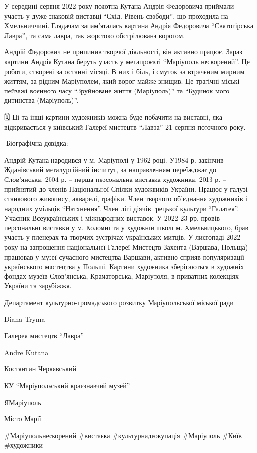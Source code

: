 У середині серпня 2022 року полотна Кутана Андрія Федоровича приймали участь у
дуже знаковій виставці \enquote{Схід. Рівень свободи}, що проходила на Хмельниччині.
Глядачам запам'яталась картина Андрія Федоровича \enquote{Святогірська Лавра}, та сама
лавра, так жорстоко обстрілювана ворогом.

Андрій Федорович не припинив творчої діяльності, він активно працює. Зараз
картини Андрія Кутана беруть участь у мегапроєкті \enquote{Маріуполь нескорений}. Це
роботи, створені за останні місяці. В них і біль, і смуток за втраченим мирним
життям, за рідним Маріуполем, який ворог майже знищив. Це трагічні міські
пейзажі воєнного часу \enquote{Зруйноване життя (Маріуполь)} та
\enquote{Будинок мого дитинства (Маріуполь)}.

🗓 Ці та інші картини художників можна буде побачити на виставці, яка
відкривається у київський Галереї мистецтв \enquote{Лавра} 21 серпня поточного року.

📝Біографічна довідка:

Андрій Кутана народився у м. Маріуполі у 1962 році. У1984 р. закінчив
Жданівський металургійний інститут, за направленням переїжджає до Слов'янська.
2004 р. – перша персональна виставка художника. 2013 р. – прийнятий до членів
Національної Спілки художників України. Працює у галузі станкового живопису,
акварелі, графіки. Член творчого об'єднання художників і народних умільців
\enquote{Натхнення}. Член лігі діячів грецької культури \enquote{Галатея}. Учасник
Всеукраїнських і міжнародних виставок. У 2022-23 рр. провів персональні
виставки у м. Коломиї та у художній школі м. Хмельницького, брав участь у
пленерах та творчих зустрічах українських митців. У листопаді 2022 року на
запрошення національної Галереї Мистецтв Захента (Варшава, Польща) працював у
музеї сучасного мистецтва Варшави, активно сприяв популяризації українського
мистецтва у Польщі. Картини художника зберігаються в художніх фондах музеїв
Слов'янська, Краматорська, Маріуполя, в приватних колекціях України та
зарубіжжя.

Департамент культурно-громадського розвитку Маріупольської міської ради\par
Diana Tryma\par
Галерея мистецтв \enquote{Лавра}\par
Andre Kutana\par
Костянтин Чернявський\par
КУ \enquote{Маріупольський краєзнавчий музей}\par
ЯМаріуполь\par
Місто Марії\par
\#Маріупольнескорений \#виставка \#культурнадеокупація \#Маріуполь \#Київ \#художники\par
